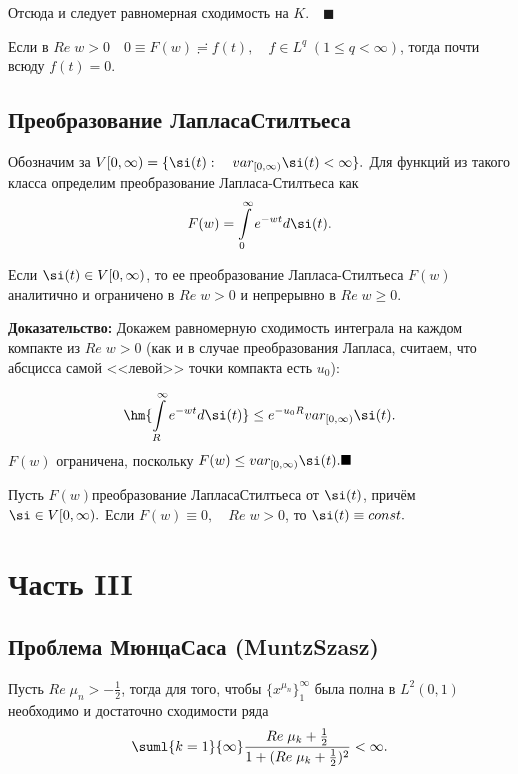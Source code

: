 \documentclass[a4paper]{article}
\begin{document}
Отсюда и следует равномерная сходимость на $K.\quad\blacksquare$

\begin{theorems}[Единственности]
Если в $Re\;w>0\quad0\equiv F(w)\risingdotseq f(t),\quad f\in
L^q\;(1\le q<\infty)$, тогда почти всюду $f(t)=0.$
\end{theorems}

\subsection{Преобразование Лапласа\ч Стилтьеса}
Обозначим за $V[0,\infty)=\{\si(t):\quad var_{[0,\infty)}
\si(t)<\infty\}.$ Для функций из такого класса определим
преобразование Лапласа-Стилтьеса как
$$F(w)=\int\limits_0^{\infty}e^{-wt}d\si(t).$$

\begin{theorems}
Если $\si(t)\in V[0,\infty)$, то ее преобразование
Лапласа-Стилтьеса $F(w)$ аналитично и ограничено в $Re\;w>0$ и
непрерывно в $Re\;w\ge0.$
\end{theorems}
\textbf{Доказательство:} Докажем равномерную сходимость интеграла
на каждом компакте из $Re\;w>0$ (как и в случае преобразования
Лапласа, считаем, что абсцисса самой <<левой>> точки компакта есть
$u_0$):

$$\hm{\int\limits_R^{\infty}e^{-wt}d\si(t)}\le e^{-u_0 R}var_{[0,\infty)}\si(t).$$
$F(w)$ ограничена, поскольку $F(w)\le
var_{[0,\infty)}\si(t).\blacksquare$

\begin{theorems}[Единственности]
Пусть $F(w)$\т преобразование Лапласа\ч Стилтьеса от $\si(t)$, причём $\si\in V[0,\infty).$ Если
$F(w)\equiv0,\quad Re\;w>0$, то $\si(t)\equiv const.$
\end{theorems}


\newpage
\section{Часть III}
\subsection{Проблема Мюнца\ч Саса (Muntz\ч Szasz)}
\begin{theorems}[Сас 1916]\label{sas}
Пусть $Re\;\mu_n>-\frac12$, тогда для того, чтобы
$\{x^{\mu_n}\}_1^{\infty}$ была полна в $L^2(0,1)$ необходимо и
достаточно сходимости ряда
$$\suml{k=1}{\infty}\frac{Re\;\mu_k+\frac12}{1+(Re\;\mu_k+\frac12)^2}<\infty.$$
\end{theorems}
\end{document}
